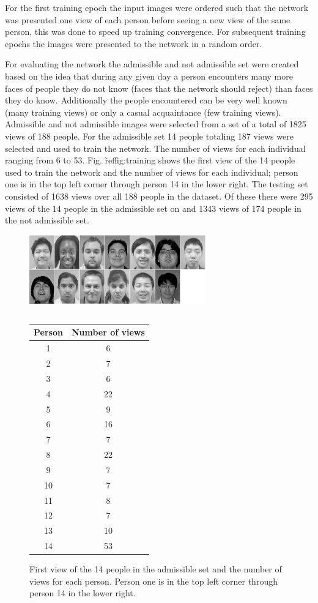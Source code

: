 \documentclass[conference]{IEEEtran}
\begin{document}
For the first training epoch the input images were ordered such that the network was presented one view of each person before seeing a new view of the same person, this was done to speed up training convergence.  For subsequent training epochs the images were presented to the network in a random order.

For evaluating the network the admissible and not admissible set were created based on the idea that during any given day a person encounters many more faces of people they do not know (faces that the network should reject) than faces they do know.  Additionally the people encountered can be very well known (many training views) or only a casual acquaintance (few training views).  Admissible and not admissible images were selected from a set of a total of 1825 views of 188 people.  For the admissible set 14 people totaling 187 views were selected and used to train the network. The number of views for each individual ranging from 6 to 53. Fig. \~ref{fig:training} shows the first view of the 14 people used to train the network and the number of views for each individual; person one is in the top left corner through person 14 in the lower right. The testing set consisted of 1638 views over all 188 people in the dataset.  Of these there were 295 views of the 14 people in the admissible set on and 1343 views of 174 people in the not admissible set.  

\begin{figure}
\center
\fontsize{8}{12}\selectfont
\includegraphics[width=3in]{figs/training_faces}
\begin{tabular}{c} \\[3ex] \end{tabular}
\begin{tabular}{|c|c|}
  \hline
  Person & Number of views\\
  \hline
  1 & 6\\
  2 & 7\\
  3 & 6\\
  4 & 22\\
  5 & 9\\
  6 & 16\\
  7 & 7\\
  8 & 22\\
  9 & 7\\
  10 & 7\\
  11 & 8\\
  12 & 7\\
  13 & 10\\
  14 & 53\\
  \hline
\end{tabular}
\caption{First view of the 14 people in the admissible set and the number of views for each person.  Person one is in the top left corner through person 14 in the lower right.}
\label{fig:training}
\end{figure}
\end{document}
